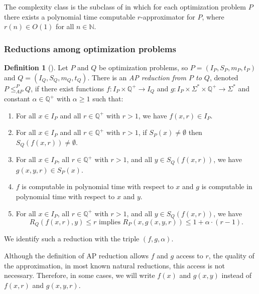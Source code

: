 \documentclass[]{article}
\theoremstyle{plain}
\theoremstyle{definition}
\newtheorem{definition}{Definition}
\newcommand{\APr}{\leq_{AP}^{P}}
\begin{document}
The complexity class \APX{} is the subclass of \NPO in which for each optimization problem $P$ there exists a polynomial time computable $r$-approximator for $P$, where $r(n) \in O(1)$ for all $n \in \mathbb{N}$.

\subsubsection{Reductions among optimization problems}

\begin{definition}[{\cite[Definition~8.3]{book}}]
  Let $P$ and $Q$ be optimization problems, so $P = (I_P, S_P, m_P, t_P)$ and $Q = (I_Q, S_Q, m_Q, t_Q)$.
  There is an \emph{AP reduction from $P$ to $Q$}, denoted $P \APr Q$, if there exist functions $f \colon I_P \times \mathbb{Q}^+ \to I_Q$ and $g \colon I_P \times \Sigma^* \times \mathbb{Q}^+ \to \Sigma^*$ and constant $\alpha \in \mathbb{Q}^+$ with $\alpha \geq 1$ such that:
  \begin{enumerate}
  \item For all $x \in I_P$ and all $r \in \mathbb{Q}^+$ with $r > 1$, we have $f(x, r) \in I_P$.
  \item For all $x \in I_P$ and all $r \in \mathbb{Q}^+$ with $r > 1$, if $S_P(x) \neq \emptyset$ then $S_Q(f(x, r)) \neq \emptyset$.
  \item For all $x \in I_P$, all $r \in \mathbb{Q}^+$ with $r > 1$, and all $y \in S_Q(f(x, r))$, we have $g(x, y, r) \in S_P(x)$.
  \item $f$ is computable in polynomial time with respect to $x$ and $g$ is computable in polynomial time with respect to $x$ and $y$.
  \item For all $x \in I_P$, all $r \in \mathbb{Q}^+$ with $r > 1$, and all $y \in S_Q(f(x, r))$, we have
    \begin{equation*}
      R_Q(f(x, r), y) \leq r \text{ implies } R_P(x, g(x, y, r)) \leq 1 + \alpha \cdot (r - 1).
    \end{equation*}
  \end{enumerate}
  We identify such a reduction with the triple $(f, g, \alpha)$.
\end{definition}

Although the definition of AP reduction allows $f$ and $g$ access to $r$, the quality of the approximation, in most known natural reductions, this access is not necessary.
Therefore, in some cases, we will write $f(x)$ and $g(x, y)$ instead of $f(x, r)$ and $g(x, y, r)$.
\end{document}
